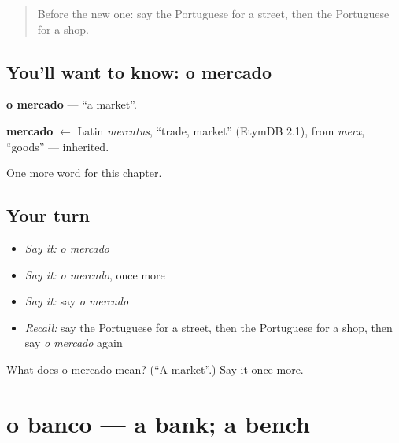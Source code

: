 \label{lesson:PT-C73-mercado}



\begin{quote}
Before the new one: say the Portuguese for a street, then the Portuguese for a shop.
\end{quote}

\subsection*{You'll want to know: o mercado}
\textbf{o mercado} — \textquotedblleft{}a market\textquotedblright{}.

\begin{cousinweb}
\textbf{mercado} $\leftarrow$ Latin \emph{mercatus}, \textquotedblleft{}trade, market\textquotedblright{} (EtymDB 2.1), from \emph{merx}, \textquotedblleft{}goods\textquotedblright{} — inherited.
\end{cousinweb}

\begin{grammarlens}[title={What you've built}]
One more word for this chapter.
\end{grammarlens}

\subsection*{Your turn}
\begin{itemize}
\raggedright
  \item \emph{Say it:} \emph{o mercado}
  \item \emph{Say it:} \emph{o mercado}, once more
  \item \emph{Say it:} say \emph{o mercado}
  \item \emph{Recall:} say the Portuguese for a street, then the Portuguese for a shop, then say \emph{o mercado} again
\end{itemize}

\begin{tcolorbox}[breakable,colback=teal!4,colframe=teal!35!black,title={Before you move on}]
What does o mercado mean? (\textquotedblleft{}A market\textquotedblright{}.) Say it once more.
\end{tcolorbox}
\section[o banco]{o banco — a bank; a bench}

\label{lesson:PT-C73-banco}



